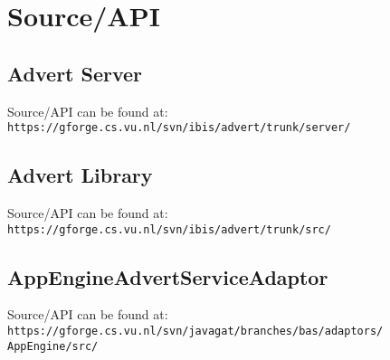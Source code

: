 \section{Source/API}
\label{src-api}

\subsection{Advert Server}
Source/API can be found at:
\texttt{https://gforge.cs.vu.nl/svn/ibis/advert/trunk/server/}

\subsection{Advert Library}
Source/API can be found at:
\texttt{https://gforge.cs.vu.nl/svn/ibis/advert/trunk/src/}

\subsection{AppEngineAdvertServiceAdaptor}
Source/API can be found at:
\texttt{https://gforge.cs.vu.nl/svn/javagat/branches/bas/adaptors/}
\texttt{AppEngine/src/}